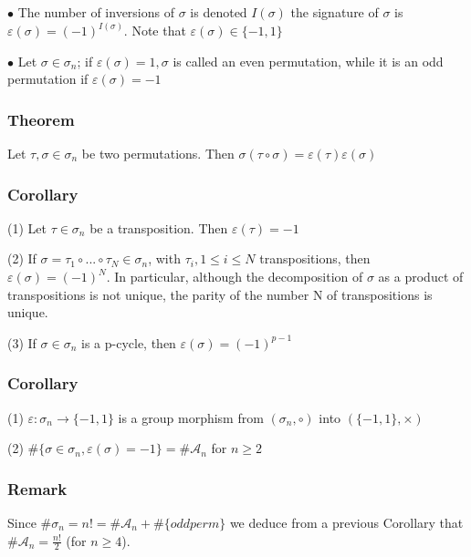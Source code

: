                 \noindent$\bullet$ The number of inversions of $\sigma$ is denoted $I(\sigma)$ the signature of $\sigma$ is $\varepsilon(\sigma)=(-1)^{I(\sigma)}$. Note that $\varepsilon(\sigma)\in\{-1,1\}$

                \noindent$\bullet$ Let $\sigma\in\sigma_n$; if $\varepsilon(\sigma)=1, \sigma$ is called an even permutation, while it is an odd permutation if $\varepsilon(\sigma)=-1$

            \subsubsection{Theorem}
                Let $\tau, \sigma\in\sigma_n$ be two permutations. Then $\sigma(\tau\circ\sigma)=\varepsilon(\tau)\varepsilon(\sigma)$

            \subsubsection{Corollary}
                (1) Let $\tau\in\sigma_n$ be a transposition. Then $\varepsilon(\tau)=-1$

                \vspace{4pt}

                \noindent(2) If $\sigma=\tau_1\circ...\circ\tau_N\in\sigma_n$, with $\tau_i, 1\leq i\leq N$ transpositions, then $\varepsilon(\sigma)=(-1)^N$. In particular, although the decomposition of $\sigma$ as a product of transpositions is not unique, the parity of the number N of transpositions is unique.

                \vspace{4pt}

                \noindent(3) If $\sigma\in\sigma_n$ is a p-cycle, then $\varepsilon(\sigma)=(-1)^{p-1}$

            \subsubsection{Corollary}
                (1) $\varepsilon:\sigma_n\rightarrow\{-1,1\}$ is a group morphism from $(\sigma_n, \circ)$ into $(\{-1,1\}, \times)$

                \vspace{4pt}

                \noindent(2) $\#\{\sigma\in\sigma_n, \varepsilon(\sigma)=-1\}=\#\mathcal{A}_n$ for $n\geq 2$

            \subsubsection{Remark}
                Since $\#\sigma_n=n!=\#\mathcal{A}_n+\#\{odd perm\}$ we deduce from a previous Corollary that $\#\mathcal{A}_n=\frac{n!}{2}$ (for $n\geq 4$).